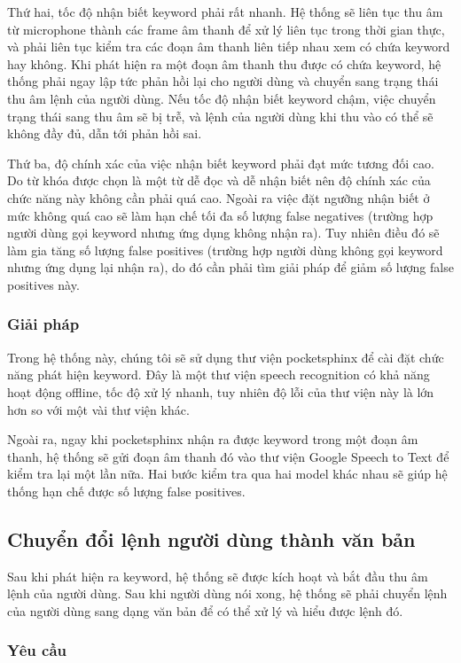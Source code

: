 Thứ hai, tốc độ nhận biết keyword phải rất nhanh. Hệ thống sẽ liên tục thu âm từ microphone thành các frame âm thanh để xử lý liên tục trong thời gian thực, và phải liên tục kiểm tra các đoạn âm thanh liên tiếp nhau xem có chứa keyword hay không. Khi phát hiện ra một đoạn âm thanh thu được có chứa keyword, hệ thống phải ngay lập tức phản hồi lại cho người dùng và chuyển sang trạng thái thu âm lệnh của người dùng. Nếu tốc độ nhận biết keyword chậm, việc chuyển trạng thái sang thu âm sẽ bị trễ, và lệnh của người dùng khi thu vào có thể sẽ không đầy đủ, dẫn tới phản hồi sai.

Thứ ba, độ chính xác của việc nhận biết keyword phải đạt mức tương đối cao. Do từ khóa được chọn là một từ dễ đọc và dễ nhận biết nên độ chính xác của chức năng này không cần phải quá cao. Ngoài ra việc đặt ngưỡng nhận biết ở mức không quá cao sẽ làm hạn chế tối đa số lượng false negatives (trường hợp người dùng gọi keyword nhưng ứng dụng không nhận ra). Tuy nhiên điều đó sẽ làm gia tăng số lượng false positives (trường hợp người dùng không gọi keyword nhưng ứng dụng lại nhận ra), do đó cần phải tìm giải pháp để giảm số lượng false positives này.

\subsubsection{Giải pháp}

Trong hệ thống này, chúng tôi sẽ sử dụng thư viện pocketsphinx để cài đặt chức năng phát hiện keyword. Đây là một thư viện speech recognition có khả năng hoạt động offline, tốc độ xử lý nhanh, tuy nhiên độ lỗi của thư viện này là lớn hơn so với một vài thư viện khác.

Ngoài ra, ngay khi pocketsphinx nhận ra được keyword trong một đoạn âm thanh, hệ thống sẽ gửi đoạn âm thanh đó vào thư viện Google Speech to Text để kiểm tra lại một lần nữa. Hai bước kiểm tra qua hai model khác nhau sẽ giúp hệ thống hạn chế được số lượng false positives.

\subsection{Chuyển đổi lệnh người dùng thành văn bản}

Sau khi phát hiện ra keyword, hệ thống sẽ được kích hoạt và bắt đầu thu âm lệnh của người dùng. Sau khi người dùng nói xong, hệ thống sẽ phải chuyển lệnh của người dùng sang dạng văn bản để có thể xử lý và hiểu được lệnh đó.

\subsubsection{Yêu cầu}

